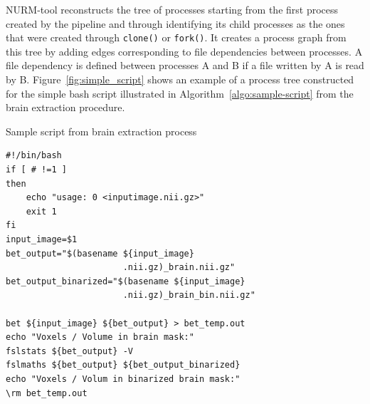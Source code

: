 \documentclass[a4paper,num-refs]{oup-contemporary}
\begin{document}
NURM-tool reconstructs the tree of processes starting from the first 
process created by the pipeline and through identifying its child 
processes as the ones that were created through \texttt{clone()} or 
\texttt{fork()}. It creates a process graph from this tree by adding 
edges corresponding to file dependencies between processes. A file 
dependency is defined between processes A and B if a file written by A 
is read by B. Figure~\ref{fig:simple_script} shows an example of a 
process tree constructed for the simple bash script illustrated in 
Algorithm~\ref{algo:sample-script} from the brain extraction procedure.


\begin{algorithm}[h!]
\caption{Sample script from brain extraction process}
\label{algo:sample-script}
\begin{verbatim}
#!/bin/bash
if [ # !=1 ]
then
    echo "usage: 0 <inputimage.nii.gz>"
    exit 1
fi
input_image=$1
bet_output="$(basename ${input_image} 
                       .nii.gz)_brain.nii.gz"
bet_output_binarized="$(basename ${input_image} 
                       .nii.gz)_brain_bin.nii.gz"

bet ${input_image} ${bet_output} > bet_temp.out
echo "Voxels / Volume in brain mask:"
fslstats ${bet_output} -V
fslmaths ${bet_output} ${bet_output_binarized}
echo "Voxels / Volum in binarized brain mask:"
\rm bet_temp.out
\end{verbatim}
\end{algorithm}
\end{document}

